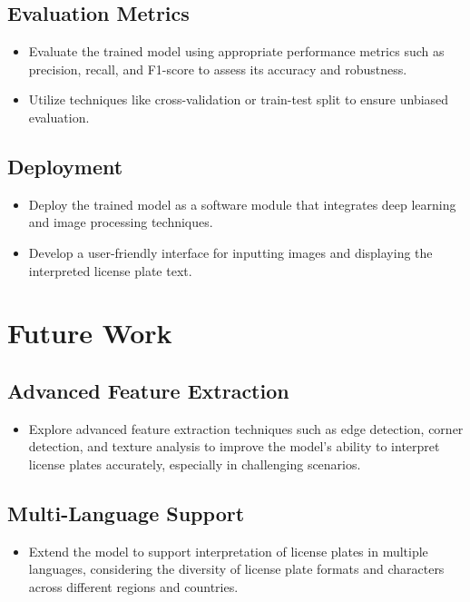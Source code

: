 \subsection*{Evaluation Metrics}
\begin{itemize}
	\item Evaluate the trained model using appropriate performance metrics such as precision, recall, and F1-score to assess its accuracy and robustness.
	\item Utilize techniques like cross-validation or train-test split to ensure unbiased evaluation.
\end{itemize}

\subsection*{Deployment}
\begin{itemize}
	\item Deploy the trained model as a software module that integrates deep learning and image processing techniques.
	\item Develop a user-friendly interface for inputting images and displaying the interpreted license plate text.
\end{itemize}


\section{Future Work}

	
	
	\subsection*{Advanced Feature Extraction}
	\begin{itemize}
		\item Explore advanced feature extraction techniques such as edge detection, corner detection, and texture analysis to improve the model's ability to interpret license plates accurately, especially in challenging scenarios.
	\end{itemize}
	
	\subsection*{Multi-Language Support}
	\begin{itemize}
		\item Extend the model to support interpretation of license plates in multiple languages, considering the diversity of license plate formats and characters across different regions and countries.
	\end{itemize}
	

